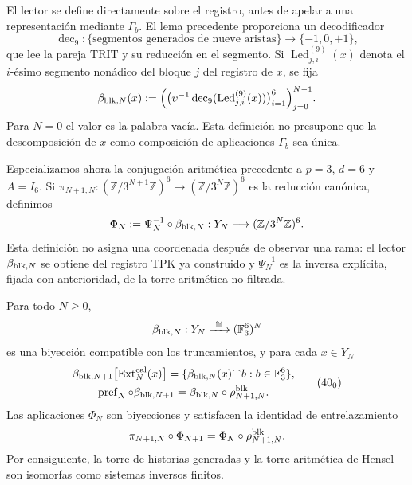 El lector se define directamente sobre el registro, antes de apelar a una
representación mediante \(\Gamma_b\). El lema precedente proporciona un
decodificador
\[
 \operatorname{dec}_9:\{\text{segmentos generados de nueve aristas}\}
 \longrightarrow\{-1,0,+1\},
\]
que lee la pareja TRIT y su reducción en el segmento. Si
\(\operatorname{Led}^{(9)}_{j,i}(x)\) denota el \(i\)-ésimo segmento nonádico
del bloque \(j\) del registro de \(x\), se fija
\begin{equation}
 \beta_{{\rm blk},N}(x):=
 \Bigl(
   \bigl(\upsilon^{-1}\operatorname{dec}_9
          (\operatorname{Led}^{(9)}_{j,i}(x))\bigr)_{i=1}^{6}
 \Bigr)_{j=0}^{N-1}.
 \label{eq:lector-bloques-ch}
\end{equation}
Para \(N=0\) el valor es la palabra vacía. Esta definición no presupone que
la descomposición de \(x\) como composición de aplicaciones \(\Gamma_b\) sea
única.

Especializamos ahora la conjugación aritmética precedente a
\(p=3\), \(d=6\) y \(A=I_6\). Si
\(\pi_{N+1,N}:(\mathbb Z/3^{N+1}\mathbb Z)^6\to
(\mathbb Z/3^N\mathbb Z)^6\) es la reducción canónica, definimos
\begin{equation}
 \Phi_N:=\Psi_N^{-1}\circ\beta_{{\rm blk},N}:
 Y_N\longrightarrow(\mathbb Z/3^N\mathbb Z)^6.
 \label{eq:phi-hensel-bloques-ch}
\end{equation}
Esta definición no asigna una coordenada después de observar una rama: el
lector \(\beta_{{\rm blk},N}\) se obtiene del registro TPK ya construido y
\(\Psi_N^{-1}\) es la inversa explícita, fijada con anterioridad, de la torre
aritmética no filtrada.

\begin{proposition}
\label{prop:cobertura-729-seccion}
Para todo \(N\geq0\),
\[
 \beta_{{\rm blk},N}:Y_N\xrightarrow{\ \cong\ }
 (\mathbb F_3^6)^N
\]
es una biyección compatible con los truncamientos, y para cada \(x\in Y_N\)
\[
 \begin{gathered}
 \beta_{{\rm blk},N+1}
 \bigl[\operatorname{Ext}^{\rm cal}_N(x)\bigr]
 =\{\beta_{{\rm blk},N}(x)^\frown b:
       b\in\mathbb F_3^6\},\\
 \operatorname{pref}_N\circ\beta_{{\rm blk},N+1}
 =\beta_{{\rm blk},N}\circ\rho^{\rm blk}_{N+1,N}.
 \end{gathered}
\tag{40$_0$}
\label{eq:cobertura-729-ch}
\]
Las aplicaciones \(\Phi_N\) son biyecciones y satisfacen la identidad de
entrelazamiento
\begin{equation}
 \pi_{N+1,N}\circ\Phi_{N+1}
 =\Phi_N\circ\rho^{\rm blk}_{N+1,N}.
 \label{eq:entrelazamiento-hensel-ext-ch}
\end{equation}
Por consiguiente, la torre de historias generadas y la torre aritmética de
Hensel son isomorfas como sistemas inversos finitos.
\end{proposition}

